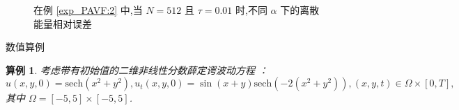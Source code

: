 \documentclass[aspectratio=169]{beamer}
\newtheorem{myexample}{算例}[section] %
\numberwithin{theorem}{section} %
\numberwithin{equation}{section}%
\numberwithin{figure}{section}%
\numberwithin{table}{section}%
\begin{document}
\begin{frame}%
	\begin{figure}[H]
		\begin{center}
		  
		\caption{在例 \ref{exp_PAVF:2} 中,当 $N = 512$ 且 $\tau=0.01$ 时,不同 $\alpha$ 下的离散能量相对误差}\label{fig_PAVF:6}
		\end{center}
		\end{figure}
\end{frame}

\begin{frame}{数值算例}
	\begin{myexample}\label{exp_PAVF:4}
		考虑带有初始值的二维非线性分数薛定谔波动方程 ：
		\begin{equation}\label{eq_PAVF_110}
		u(x,y, 0)=\mbox{sech}\left(x^2+y^2\right), u_t(x,y, 0)=\sin (x+y) \mbox{sech}\left(-2(x^2+y^2)\right), (x,y,t)\in  \Omega\times[0, T],
		\end{equation}
		其中 $\Omega=[-5,5] \times[-5,5]$.
		\end{myexample}
\end{frame}
\end{document}
